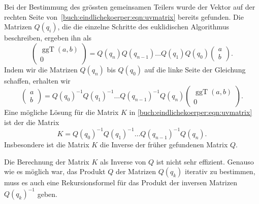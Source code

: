 Bei der Bestimmung des grössten gemeinsamen Teilers wurde der Vektor auf
der rechten Seite von~\eqref{buch:eindlichekoerper:eqn:uvmatrix} bereits
gefunden.
Die Matrizen $Q(q_i)$, die die einzelne Schritte des euklidischen
Algorithmus beschreiben, ergeben ihn als
\[
\begin{pmatrix}
\operatorname{ggT}(a,b)\\0
\end{pmatrix}
=
Q(q_n)Q(q_{n-1}) \dots Q(q_1)Q(q_0)
\begin{pmatrix}a\\b\end{pmatrix}.
\]
Indem wir die Matrizen $Q(q_n)$ bis $Q(q_0)$ auf die linke Seite der
Gleichung schaffen, erhalten wir
\[
\begin{pmatrix}a\\b\end{pmatrix}
=
Q(q_0)^{-1}
Q(q_1)^{-1}
\dots
Q(q_{n-1})^{-1}
Q(q_n)
\begin{pmatrix}\operatorname{ggT}(a,b)\\0\end{pmatrix}.
\]
Eine mögliche Lösung für die Matrix $K$ in
\eqref{buch:eindlichekoerper:eqn:uvmatrix}
ist der die Matrix
\[
K
=
Q(q_0)^{-1}
Q(q_1)^{-1}
\dots
Q(q_{n-1})^{-1}
Q(q_n).
\]
Insbesondere ist die Matrix $K$ die Inverse der früher gefundenen
Matrix $Q$.

Die Berechnung der Matrix $K$ als Inverse von $Q$ ist nicht sehr
effizient.
Genauso wie es möglich war, das Produkt $Q$ der Matrizen
$Q(q_k)$ iterativ zu bestimmen, muss es auch eine Rekursionsformel
für das Produkt der inversen Matrizen $Q(q_k)^{-1}$ geben.

